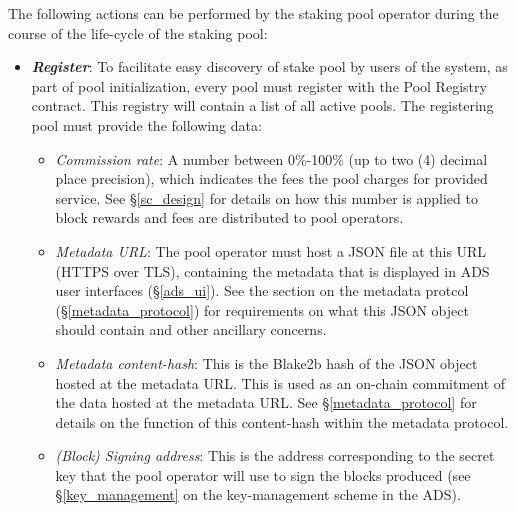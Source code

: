The following actions can be performed by the staking pool operator during the course of the life-cycle of the staking pool: 
\begin{itemize}
    \item \textbf{\textit{Register}}: To facilitate easy discovery of stake pool by users of the system, as part of pool initialization, every pool must register with the Pool Registry contract. This registry will contain a list of all active pools. The registering pool must provide the following data: 
    \begin{itemize}
        \item \textit{Commission rate}: A number between 0\%-100\% (up to two (4) decimal place precision), which indicates the fees the pool charges for provided service. See \S\ref{sc_design} for details on how this number is applied to block rewards and fees are distributed to pool operators. 
        \item \textit{Metadata URL}: The pool operator must host a JSON file at this URL (HTTPS over TLS), containing the metadata that is displayed in ADS user interfaces (\S\ref{ads_ui}). See the section on the metadata protcol (\S\ref{metadata_protocol}) for requirements on what this JSON object should contain and other ancillary concerns. 
        \item \textit{Metadata content-hash}: This is the Blake2b hash of the JSON object hosted at the metadata URL. This is used as an on-chain commitment of the data hosted at the metadata URL. See \S\ref{metadata_protocol} for details on the function of this content-hash within the metadata protocol. 
        \item \textit{(Block) Signing address}: This is the address corresponding to the secret key that the pool operator will use to sign the blocks produced (see \S\ref{key_management} on the key-management scheme in the ADS). 
    \end{itemize}
    

\end{itemize}
